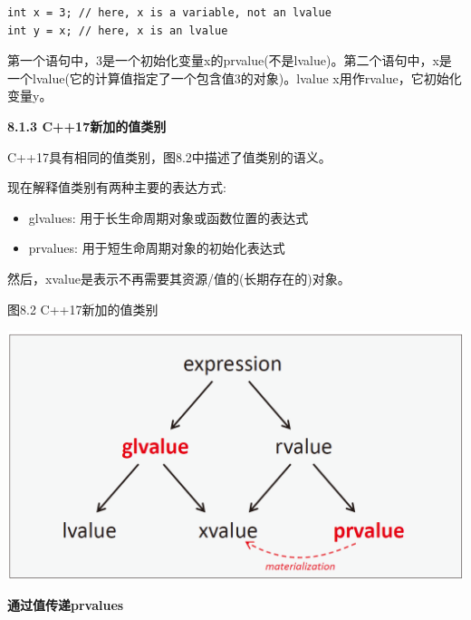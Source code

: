 \begin{lstlisting}[caption={}]
int x = 3; // here, x is a variable, not an lvalue
int y = x; // here, x is an lvalue
\end{lstlisting}

第一个语句中，3是一个初始化变量x的prvalue(不是lvalue)。第二个语句中，x是一个lvalue(它的计算值指定了一个包含值3的对象)。lvalue x用作rvalue，它初始化变量y。\par

\hspace*{\fill} \par %
\textbf{8.1.3 C++17新加的值类别}

C++17具有相同的值类别，图8.2中描述了值类别的语义。\par

现在解释值类别有两种主要的表达方式:\par

\begin{itemize}
	\item glvalues: 用于长生命周期对象或函数位置的表达式
	\item prvalues: 用于短生命周期对象的初始化表达式
\end{itemize}

然后，xvalue是表示不再需要其资源/值的(长期存在的)对象。\par

\hspace*{\fill} \par %
图8.2 C++17新加的值类别\par

\begin{center}
	\includegraphics[width=1.0\textwidth]{content/1/chapter8/images/2}
\end{center}

\hspace*{\fill} \par %
\textbf{通过值传递prvalues}

